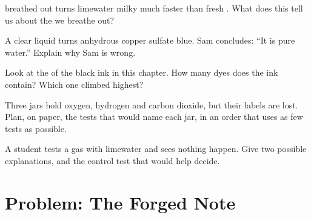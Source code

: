 \begin{exercise}[$\star\star$]\label{exo:g7:identifying-substances:8}
 breathed out turns limewater milky much faster than fresh .
What does this tell us about the  we breathe out?
\end{exercise}

\begin{exercise}[$\star\star$]\label{exo:g7:identifying-substances:9}
A clear liquid turns anhydrous copper sulfate blue. Sam concludes:
``It is pure water.'' Explain why Sam is wrong.
\end{exercise}

\begin{exercise}[$\star\star$]\label{exo:g7:identifying-substances:10}
Look at the  of the black ink in this chapter. How many dyes
does the ink contain? Which one climbed highest?
\end{exercise}

\begin{exercise}[$\star\star\star$]\label{exo:g7:identifying-substances:11}
Three jars hold oxygen, hydrogen and carbon dioxide, but their labels are
lost. Plan, on paper, the tests that would name each jar, in an order
that uses as few tests as possible.
\end{exercise}

\begin{exercise}[$\star\star\star$]\label{exo:g7:identifying-substances:12}
A student tests a gas with limewater and sees nothing happen. Give two
possible explanations, and the control test that would help decide.
\end{exercise}

\section{Problem: The Forged Note}

